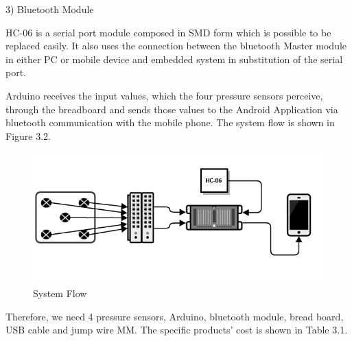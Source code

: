 \documentclass[conference]{IEEEtran}
\begin{document}
3)	Bluetooth Module

HC-06 is a serial port module composed in SMD form which is possible to be replaced easily. It also uses the connection between the bluetooth Master module in either PC or mobile device and embedded system in substitution of the serial port. 

Arduino receives the input values, which the four pressure sensors perceive, through the breadboard and sends those values to the Android Application via bluetooth communication with the mobile phone. The system flow is shown in Figure 3.2.\\

\begin{figure}[htbp]
\begin{center}
    \includegraphics[scale=0.4]{img_01.png}
    \caption{System Flow} 
\end{center}
\end{figure}

Therefore, we need 4 pressure sensors, Arduino, bluetooth module, bread board, USB cable and jump wire MM. The specific products' cost is shown in Table 3.1.\\

\end{document}
